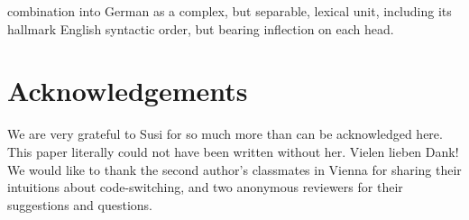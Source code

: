 \documentclass[output=paper]{langscibook}
\begin{document}
combination into German as a complex, but separable, lexical unit, including its hallmark English syntactic order, but bearing inflection on each head. 

\section*{Acknowledgements}
We are very grateful to Susi for so much more than can be acknowledged here. This paper literally could not have been written without her. Vielen lieben Dank! We would like to thank the second author's classmates in Vienna for sharing their intuitions about code-switching, and two anonymous reviewers for their suggestions and questions.

{\sloppy\printbibliography[heading=subbibliography,notkeyword=this]}
\end{document}

